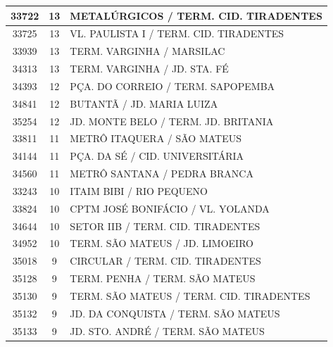 \documentclass[
	12pt,				%
	oneside,			%
	a4paper,			%
	english,			%
	brazil				%
	]{abntex2ppgsi}
\begin{document}
\begin{apendicesenv}
\begin{longtable}{c|c|p{7cm}}
    33722 & 13    & METALÚRGICOS / TERM. CID. TIRADENTES \\
\hline

    33725 & 13    & VL. PAULISTA I / TERM. CID. TIRADENTES \\
\hline

    33939 & 13    & TERM. VARGINHA / MARSILAC \\
\hline

    34313 & 13    & TERM. VARGINHA / JD. STA. FÉ \\
\hline

    34393 & 12    & PÇA. DO CORREIO / TERM. SAPOPEMBA \\
\hline

    34841 & 12    & BUTANTÃ / JD. MARIA LUIZA \\
\hline

    35254 & 12    & JD. MONTE BELO / TERM. JD. BRITANIA \\
\hline

    33811 & 11    & METRÔ ITAQUERA / SÃO MATEUS \\
\hline

    34144 & 11    & PÇA. DA SÉ / CID. UNIVERSITÁRIA \\
\hline

    34560 & 11    & METRÔ SANTANA / PEDRA BRANCA \\
\hline

    33243 & 10    & ITAIM BIBI / RIO PEQUENO \\
\hline

    33824 & 10    & CPTM JOSÉ BONIFÁCIO / VL. YOLANDA \\
\hline

    34644 & 10    & SETOR IIB / TERM. CID. TIRADENTES \\
\hline

    34952 & 10    & TERM. SÃO MATEUS / JD. LIMOEIRO \\
\hline

    35018 & 9     & CIRCULAR / TERM. CID. TIRADENTES \\
\hline

    35128 & 9     & TERM. PENHA / TERM. SÃO MATEUS \\
\hline

    35130 & 9     & TERM. SÃO MATEUS / TERM. CID. TIRADENTES \\
\hline

    35132 & 9     & JD. DA CONQUISTA / TERM. SÃO MATEUS \\
\hline

    35133 & 9     & JD. STO. ANDRÉ / TERM. SÃO MATEUS \\
\hline


\end{longtable}
\end{apendicesenv}
\end{document}
